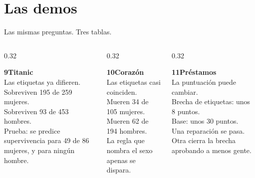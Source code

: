 \documentclass[aspectratio=169,11pt]{beamer}
\begin{document}
\section{Las demos}

\begin{frame}{Las mismas preguntas. Tres tablas.}
  \footnotesize
  \begin{columns}[T]
    \begin{column}{0.32\textwidth}
      \colorbox{ebdcard}{\parbox[t]{0.9\textwidth}{%
        \raggedright
        {\small\color{ebdnavy}\textbf{9\quad Titanic}}\\[0.25em]
        Las etiquetas ya difieren.\\[0.25em]
        Sobreviven 195 de 259 mujeres.\\
        Sobreviven 93 de 453 hombres.\\[0.25em]
        Prueba: se predice supervivencia para 49 de 86 mujeres, y para ningún hombre.\par}}
    \end{column}
    \begin{column}{0.32\textwidth}
      \colorbox{ebdcard}{\parbox[t]{0.9\textwidth}{%
        \raggedright
        {\small\color{ebdgreen}\textbf{10\quad Corazón}}\\[0.25em]
        Las etiquetas casi coinciden.\\[0.25em]
        Mueren 34 de 105 mujeres.\\
        Mueren 62 de 194 hombres.\\[0.25em]
        La regla que nombra el sexo apenas se dispara.\par}}
    \end{column}
    \begin{column}{0.32\textwidth}
      \colorbox{ebdcard}{\parbox[t]{0.9\textwidth}{%
        \raggedright
        {\small\color{ebdamber}\textbf{11\quad Préstamos}}\\[0.25em]
        La puntuación puede cambiar.\\[0.25em]
        Brecha de etiquetas: unos 8 puntos.\\
        Base: unos 30 puntos.\\[0.25em]
        Una reparación se pasa. Otra cierra la brecha aprobando a menos gente.\par}}
    \end{column}
  \end{columns}
\end{frame}
\end{document}
